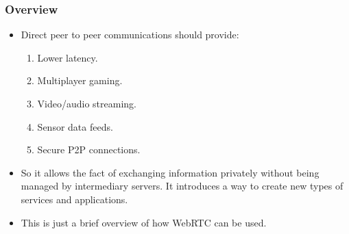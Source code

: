 \begin{frame}[fragile]\frametitle{Overview}
\begin{itemize}

\item Direct peer to peer communications should provide:
\begin{enumerate}
 \item Lower latency.
 \item Multiplayer gaming.
 \item Video/audio streaming.
 \item Sensor data feeds.
 \item Secure P2P connections. %
 
\end{enumerate}
\item So it allows the fact of exchanging information privately without being managed by intermediary servers. 
It introduces a way to create new types of services and applications.

\item This is just a brief overview of how WebRTC can be used.
\end{itemize}
\end{frame}
\clearpage


